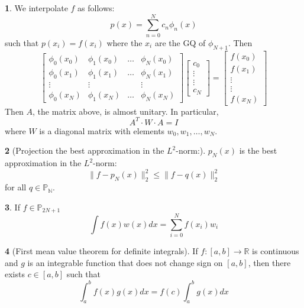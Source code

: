 \documentclass[12pt]{article}
\theoremstyle{definition}
\newtheorem{theorem}{\color{ForestGreen}{\textbf{Theorem}}}
\newcommand{\R}{\mathbb{R}}
\newcommand{\norm}[1]{\lVert#1\rVert}
\begin{document}
\begin{theorem}
We interpolate $f$ as follows:
\begin{equation}
p(x) = \sum_{n=0}^N c_n \phi_n(x)
\end{equation}
such that $p(x_i) = f(x_i)$ where the $x_i$ are the GQ of $\phi_{N+1}$. Then
\begin{equation}
\begin{bmatrix}
\phi_0(x_0) & \phi_1(x_0) & \hdots & \phi_N(x_0) \\
\phi_0(x_1) & \phi_1(x_1) & \hdots & \phi_N(x_1) \\
\vdots & \vdots & & \vdots  \\
\phi_0(x_N) & \phi_1(x_N) & \hdots & \phi_N(x_N)
\end{bmatrix}
\begin{bmatrix}
c_0 \\ \vdots \\ \vdots \\ c_N
\end{bmatrix}
=
\begin{bmatrix}
f(x_0) \\ f(x_1) \\ \vdots \\ \vdots  \\ f(x_N)
\end{bmatrix}
\end{equation}
Then $A$, the matrix above, is almost unitary. In particular,
\begin{equation}
A^T \cdot W \cdot A = I
\end{equation}
where $W$ is a diagonal matrix with elements $w_0, w_1, \ldots, w_N$.
\end{theorem}

\begin{theorem}[Projection the best approximation in the $L^2$-norm:]
$p_N(x)$ is the best approximation in the $L^2$-norm:
\begin{equation}
\norm{f-p_N(x)}^2_2 \leq \norm{f-q(x)}^2_2
\end{equation}
for all $q \in \mathbb{P_N}$.
\end{theorem}

\begin{theorem}
If $f \in \mathbb{P}_{2N+1}$
\begin{equation}
\int f(x)w(x)dx = \sum_{i=0}^N f(x_i)w_i
\end{equation}
\end{theorem}

\begin{theorem}[First mean value theorem for definite integrals]
If $f:[a,b] \to \R$ is continuous and $g$ is an integrable function that does not change sign on $[a,b]$, then there exists $c \in [a,b]$ such that
\begin{equation}
\int_a^b f(x)g(x) dx = f(c)\int_a^b g(x)dx
\end{equation}
\end{theorem}
\end{document}
